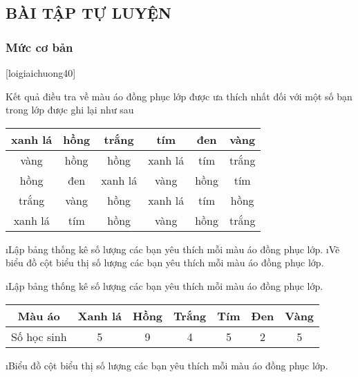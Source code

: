 \subsection{BÀI TẬP TỰ LUYỆN} 
\subsubsection*{Mức cơ bản}
[loigiaichuong40]
\begin{bt}
	Kết quả điều tra về màu áo đồng phục lớp được ưa thích nhất đối với một số bạn trong lớp được ghi lại như sau
	\begin{center}
		\begin{tabular}{|c|c|c|c|c|c|}
			\hline
			xanh lá	&hồng&	trắng&	tím&	đen&	vàng\\
			\hline
			vàng	&hồng&	hồng&	xanh lá&	tím	&trắng\\
			\hline
			hồng	&đen&	xanh lá&	vàng&	hồng&	tím\\
			\hline
			trắng	&vàng&	hồng&	xanh lá&	tím&	hồng\\
			\hline
			xanh lá	&tím&	hồng&	vàng&	hồng&	trắng\\
			\hline
		\end{tabular}
	\end{center}
	\begin{enumerate}[a),leftmargin=*]
		\i Lập bảng thống kê số lượng các bạn yêu thích mỗi màu áo đồng phục lớp.
		\i Vẽ biểu đồ cột biểu thị số lượng các bạn yêu thích mỗi màu áo đồng phục lớp.
	\end{enumerate}
	\begin{loigiaichuong40}
		\begin{enumerate}[a),leftmargin=*]
			\i Lập bảng thống kê số lượng các bạn yêu thích mỗi màu áo đồng phục lớp.
			\begin{center}
				\begin{tabular}{|c|c|c|c|c|c|c|}
					\hline
						Màu áo&	Xanh lá&	Hồng&	Trắng&	Tím&	Đen&	Vàng\\
						\hline
					Số học sinh& 5&9&4&5&2&5\\	 
					\hline
				\end{tabular}
			\end{center}
			\i Biểu đồ cột biểu thị số lượng các bạn yêu thích mỗi màu áo đồng phục lớp. 
		\end{enumerate}
	\end{loigiaichuong40}
\end{bt}
